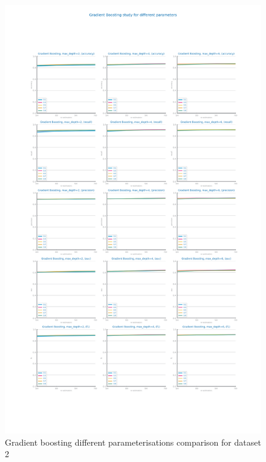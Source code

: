 \documentclass[10pt]{extarticle}
\begin{document}
\begin{figure}[H]
\centering\includegraphics[scale=0.60]{images/dataset2/models_evaluation/Credit_Score_gb_study.png}
\caption{Gradient boosting different parameterisations comparison for dataset 2}
\end{figure}
\end{document}
